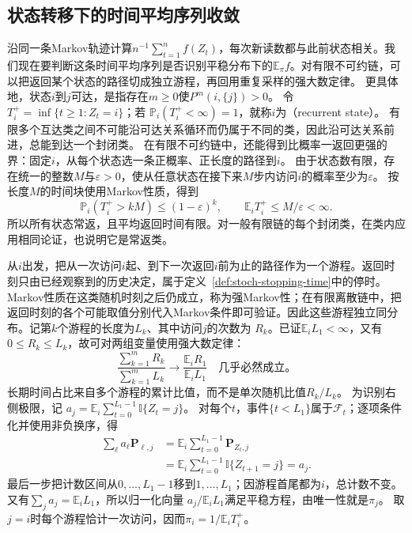 \subsection{状态转移下的时间平均序列收敛}
\label{sec:stoch-markov-long-run-average}

沿同一条Markov轨迹计算\(n^{-1}\sum_{t=1}^n f(Z_t)\)，每次新读数都与此前状态相关。我们现在要判断这条时间平均序列是否识别平稳分布下的\(\mathbb E_\pi f\)。对有限不可约链，可以把返回某个状态的路径切成独立游程，再回用重复采样的强大数定律。
更具体地，状态\(i\)到\(j\)可达，是指存在\(m\geq0\)使\(P^m(i,\{j\})>0\)。
令\(T_i^+=\inf\{t\geq1:Z_t=i\}\)；若
$\mathbb{P}_i(T_i^+<\infty)=1$，就称$i$为（recurrent state）。
有限多个互达类之间不可能沿可达关系循环而仍属于不同的类，因此沿可达关系前进，总能到达一个封闭类。
在有限不可约链中，还能得到比概率一返回更强的界：固定$i$，从每个状态选一条正概率、正长度的路径到$i$。
由于状态数有限，存在统一的整数$M$与$\varepsilon>0$，使从任意状态在接下来$M$步内访问$i$的概率至少为$\varepsilon$。
按长度$M$的时间块使用Markov性质，得到
\[
 \mathbb P_i(T_i^+>kM)\leq(1-\varepsilon)^k,\qquad
 \mathbb E_iT_i^+\leq M/\varepsilon<\infty.
\]
所以所有状态常返，且平均返回时间有限。对一般有限链的每个封闭类，在类内应用相同论证，也说明它是常返类。

从$i$出发，把从一次访问$i$起、到下一次返回$i$前为止的路径作为一个游程。返回时刻只由已经观察到的历史决定，属于定义~\ref{def:stoch-stopping-time}中的停时。Markov性质在这类随机时刻之后仍成立，称为强Markov性；在有限离散链中，把返回时刻的各个可能取值分别代入Markov条件即可验证。因此这些游程独立同分布。记第$k$个游程的长度为$L_k$、其中访问$j$的次数为
$R_k$。已证$\mathbb E_iL_1<\infty$，又有$0\leq R_k\leq L_k$，故可对两组变量使用强大数定律：
\[
  \frac{\sum_{k=1}^{m}R_k}{\sum_{k=1}^{m}L_k}
  \longrightarrow
  \frac{\mathbb{E}_iR_1}{\mathbb{E}_iL_1}
  \quad\text{几乎必然成立。}
\]
长期时间占比来自多个游程的累计比值，而不是单次随机比值$R_k/L_k$。
为识别右侧极限，记
$a_j=\mathbb E_i\sum_{t=0}^{L_1-1}\mathbb I\{Z_t=j\}$。
对每个$t$，事件$\{t<L_1\}$属于$\mathcal F_t$；逐项条件化并使用非负换序，得
\[
\begin{aligned}
 \sum_\ell a_\ell\bm P_{\ell,j}
 &=\mathbb E_i\sum_{t=0}^{L_1-1}\bm P_{Z_t,j}\\
 &=\mathbb E_i\sum_{t=0}^{L_1-1}\mathbb I\{Z_{t+1}=j\}
 =a_j.
\end{aligned}
\]
最后一步把计数区间从$0,\ldots,L_1-1$移到$1,\ldots,L_1$；因游程首尾都为$i$，总计数不变。
又有$\sum_j a_j=\mathbb E_iL_1$，所以归一化向量
$a_j/\mathbb E_iL_1$满足平稳方程，由唯一性就是$\pi_j$。
取$j=i$时每个游程恰计一次访问，因而$\pi_i=1/\mathbb E_iT_i^+$。

